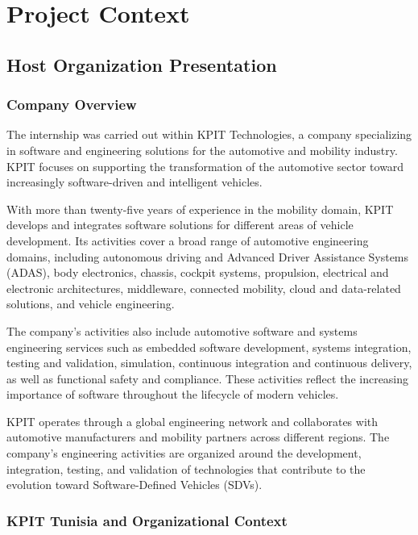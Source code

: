 \chapter{Project Context}

\section{Host Organization Presentation}

\subsection{Company Overview}

The internship was carried out within KPIT Technologies, a company specializing in software and engineering solutions for the automotive and mobility industry. KPIT focuses on supporting the transformation of the automotive sector toward increasingly software-driven and intelligent vehicles.

With more than twenty-five years of experience in the mobility domain, KPIT develops and integrates software solutions for different areas of vehicle development. Its activities cover a broad range of automotive engineering domains, including autonomous driving and Advanced Driver Assistance Systems (ADAS), body electronics, chassis, cockpit systems, propulsion, electrical and electronic architectures, middleware, connected mobility, cloud and data-related solutions, and vehicle engineering.

The company's activities also include automotive software and systems engineering services such as embedded software development, systems integration, testing and validation, simulation, continuous integration and continuous delivery, as well as functional safety and compliance. These activities reflect the increasing importance of software throughout the lifecycle of modern vehicles.

KPIT operates through a global engineering network and collaborates with automotive manufacturers and mobility partners across different regions. The company's engineering activities are organized around the development, integration, testing, and validation of technologies that contribute to the evolution toward Software-Defined Vehicles (SDVs).

\subsection{KPIT Tunisia and Organizational Context}

